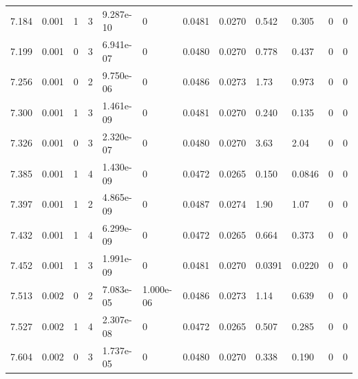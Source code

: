 \documentclass[preview]{standalone}
\begin{document}
{{{{{\begin{tabular}{L{1.2cm}C{1.2cm} C{0.3cm}C{0.5cm} C{1.4cm}C{1.4cm} C{1.4cm}C{1.4cm} C{1.6cm}C{1.6cm} C{1.6cm}C{1.6cm}}
  7.184  &  0.001  & 1     &  3 &  9.287e-10  & 0  &  0.0481&   0.0270& 0.542 & 0.305   &  0 & 0  \\ 
  7.199  &  0.001  & 0     &  3 &  6.941e-07  & 0  &  0.0480&   0.0270& 0.778 & 0.437   &  0 & 0  \\ 
  7.256  &  0.001  & 0     &  2 &  9.750e-06  & 0  &  0.0486&   0.0273& 1.73 & 0.973   &  0 & 0  \\ 
  7.300  &  0.001  & 1     &  3 &  1.461e-09  & 0  &  0.0481&   0.0270& 0.240 & 0.135   &  0 & 0  \\ 
  7.326  &  0.001  & 0     &  3 &  2.320e-07  & 0  &  0.0480&   0.0270& 3.63 & 2.04   &  0 & 0  \\ 
  7.385  &  0.001  & 1     &  4 &  1.430e-09  & 0  &  0.0472&   0.0265& 0.150 & 0.0846   &  0 & 0  \\ 
  7.397  &  0.001  & 1     &  2 &  4.865e-09  & 0  &  0.0487&   0.0274& 1.90 & 1.07   &  0 & 0  \\ 
  7.432  &  0.001  & 1     &  4 &  6.299e-09  & 0  &  0.0472&   0.0265& 0.664 & 0.373   &  0 & 0  \\ 
  7.452  &  0.001  & 1     &  3 &  1.991e-09  & 0  &  0.0481&   0.0270& 0.0391 & 0.0220   &  0 & 0  \\ 
  7.513  &  0.002  & 0     &  2 &  7.083e-05  & 1.000e-06  &  0.0486&   0.0273& 1.14 & 0.639   &  0 & 0  \\ 
  7.527  &  0.002  & 1     &  4 &  2.307e-08  & 0  &  0.0472&   0.0265& 0.507 & 0.285   &  0 & 0  \\ 
  7.604  &  0.002  & 0     &  3 &  1.737e-05  & 0  &  0.0480&   0.0270& 0.338 & 0.190   &  0 & 0  \\ 
\hline 
\end{tabular} 

}}}}}
\end{document}
